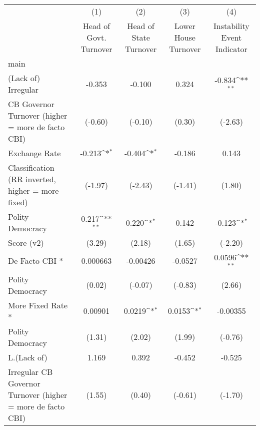 {
\def\sym#1{\ifmmode^{#1}\else\(^{#1}\)\fi}
\begin{tabular}{l*{4}{c}}
\hline\hline
                    &\multicolumn{1}{c}{(1)}&\multicolumn{1}{c}{(2)}&\multicolumn{1}{c}{(3)}&\multicolumn{1}{c}{(4)}\\
                    &\multicolumn{1}{c}{Head of Govt. Turnover}&\multicolumn{1}{c}{Head of State Turnover}&\multicolumn{1}{c}{Lower House Turnover}&\multicolumn{1}{c}{Instability Event Indicator}\\
\hline
main                &                     &                     &                     &                     \\
(Lack of) Irregular &      -0.353         &      -0.100         &       0.324         &      -0.834\sym{**} \\
CB Governor Turnover (higher = more de facto CBI)&     (-0.60)         &     (-0.10)         &      (0.30)         &     (-2.63)         \\
[1em]
Exchange Rate       &      -0.213\sym{*}  &      -0.404\sym{*}  &      -0.186         &       0.143         \\
Classification (RR inverted, higher = more fixed)&     (-1.97)         &     (-2.43)         &     (-1.41)         &      (1.80)         \\
[1em]
Polity Democracy    &       0.217\sym{**} &       0.220\sym{*}  &       0.142         &      -0.123\sym{*}  \\
Score (v2)          &      (3.29)         &      (2.18)         &      (1.65)         &     (-2.20)         \\
[1em]
De Facto CBI *      &    0.000663         &    -0.00426         &     -0.0527         &      0.0596\sym{**} \\
Polity Democracy    &      (0.02)         &     (-0.07)         &     (-0.83)         &      (2.66)         \\
[1em]
More Fixed Rate *   &     0.00901         &      0.0219\sym{*}  &      0.0153\sym{*}  &    -0.00355         \\
Polity Democracy    &      (1.31)         &      (2.02)         &      (1.99)         &     (-0.76)         \\
[1em]
L.(Lack of)         &       1.169         &       0.392         &      -0.452         &      -0.525         \\
Irregular CB Governor Turnover (higher = more de facto CBI)&      (1.55)         &      (0.40)         &     (-0.61)         &     (-1.70)         \\

\end{tabular}}

